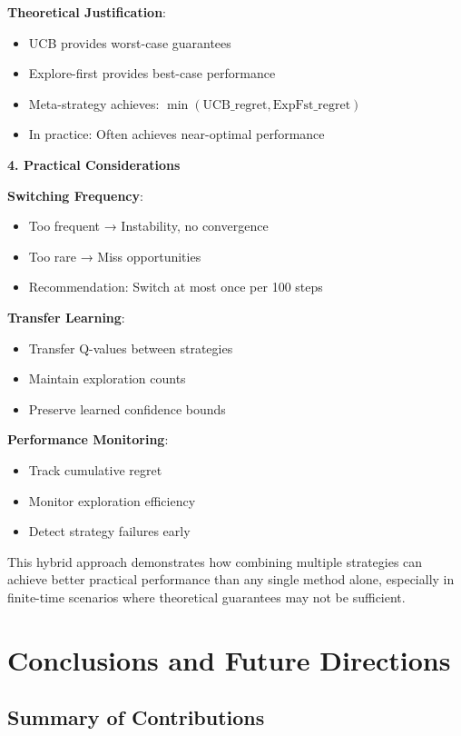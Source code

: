 \documentclass[12pt]{article}
\begin{document}
{{{\textbf{Theoretical Justification}:
\begin{itemize}
\item UCB provides worst-case guarantees
\item Explore-first provides best-case performance
\item Meta-strategy achieves: $\min(\text{UCB\_regret}, \text{ExpFst\_regret})$
\item In practice: Often achieves near-optimal performance
\end{itemize}

\textbf{4. Practical Considerations}

\textbf{Switching Frequency}:
\begin{itemize}
\item Too frequent → Instability, no convergence
\item Too rare → Miss opportunities
\item Recommendation: Switch at most once per 100 steps
\end{itemize}

\textbf{Transfer Learning}:
\begin{itemize}
\item Transfer Q-values between strategies
\item Maintain exploration counts
\item Preserve learned confidence bounds
\end{itemize}

\textbf{Performance Monitoring}:
\begin{itemize}
\item Track cumulative regret
\item Monitor exploration efficiency
\item Detect strategy failures early
\end{itemize}

This hybrid approach demonstrates how combining multiple strategies can achieve better practical performance than any single method alone, especially in finite-time scenarios where theoretical guarantees may not be sufficient.

\section{Conclusions and Future Directions}

\subsection{Summary of Contributions}

}}}
\end{document}
